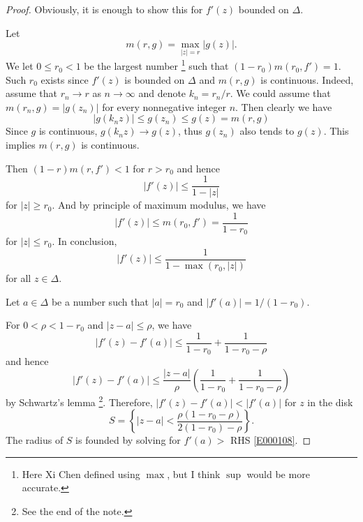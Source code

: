 \documentclass[11pt]{amsart}
\theoremstyle{remark}
\theoremstyle{definition}
\numberwithin{equation}{section}
\begin{document}
\begin{proof}
    Obviously, it is enough to show this for $f'(z)$ bounded on $\Delta$.

    Let
    \begin{equation}\label{E000103}
        m(r, g) = \max_{|z| = r} |g(z)|.
    \end{equation}
    We let $0\le r_0 < 1$ be the largest number \footnote[1]{Here Xi Chen defined using $\max$, but I think $\sup$ would be more accurate.} such that $(1-r_0) m(r_0, f') = 1$.
    Such $r_0$ exists since $f'(z)$ is bounded on $\Delta$ and $m(r,g)$ is continuous. Indeed,
    assume that $r_n \to r$ as $n \to \infty$ and denote $k_n=r_n/r$. We could assume that
    $m(r_n,g) =|g(z_n)|$ for every nonnegative integer $n$. Then clearly we have
    \[|g(k_nz)| \le g(z_n) \le g(z)= m(r,g)\]
    Since $g$ is continuous, $g(k_nz) \to g(z)$, thus $g(z_n)$ also tends to $g(z)$. This implies
    $m(r,g)$ is continuous.

    Then
    $(1-r) m(r, f') < 1$ for $r > r_0$ and hence
    \begin{equation}\label{E000104}
        |f'(z)| \le \frac{1}{1 - |z|}
    \end{equation}
    for $|z| \ge r_0$. And by principle of maximum modulus, we have
    \begin{equation}\label{E000105}
        |f'(z)| \le m(r_0, f') = \frac{1}{1 - r_0}
    \end{equation}
    for $|z| \le r_0$. In conclusion,
    \begin{equation}\label{E000106}
        |f'(z)| \le \frac{1}{1 - \max(r_0, |z|)}
    \end{equation}
    for all $z\in \Delta$.

    Let $a\in \Delta$ be a number such that $|a| = r_0$ and $|f'(a)| = 1/(1-r_0)$.

    For $0 < \rho < 1-r_0$ and $|z - a| \le \rho$, we have
    \begin{equation}\label{E000107}
        |f'(z) - f'(a)| \le \frac{1}{1 - r_0} + \frac{1}{1 - r_0 - \rho}
    \end{equation}
    and hence
    \begin{equation}\label{E000108}
        |f'(z) - f'(a)| \le \frac{|z - a|}{\rho}
        \left(\frac{1}{1 - r_0} + \frac{1}{1 - r_0 - \rho}\right)
    \end{equation}
    by Schwartz's lemma \footnote[2]{See the end of the note.}. Therefore,
    $|f'(z) - f'(a)| < |f'(a)|$ for $z$ in the disk
    \begin{equation}\label{E000110}
        S = \left\{|z - a| < \frac{\rho(1-r_0-\rho)}{2(1-r_0) - \rho}\right\}.
    \end{equation}
    The radius of $S$ is founded by solving for $f'(a)>$ RHS \ref{E000108}.


\end{proof}
\end{document}
